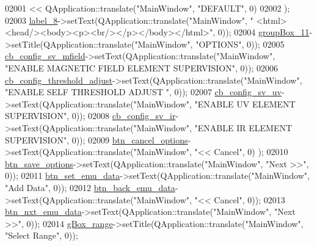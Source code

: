 \begin{DoxyCode}
02001          << QApplication::translate(\textcolor{stringliteral}{"MainWindow"}, \textcolor{stringliteral}{"DEFAULT"}, 0)
02002         );
02003         \hyperlink{a00080_af183bfbfb9f38bbdd60caf92b15e23dc}{label\_8}->setText(QApplication::translate(\textcolor{stringliteral}{"MainWindow"}, \textcolor{stringliteral}{"
      <html><head/><body><p><br/></p></body></html>"}, 0));
02004         \hyperlink{a00080_a417cb0342ea95d3fe5f7e3f4feeb6515}{groupBox\_11}->setTitle(QApplication::translate(\textcolor{stringliteral}{"MainWindow"}, \textcolor{stringliteral}{"OPTIONS"}, 0));
02005         \hyperlink{a00080_a0a83284035ab2dbaeb39946522434986}{cb\_config\_sv\_mfield}->setText(QApplication::translate(\textcolor{stringliteral}{"MainWindow"}, \textcolor{stringliteral}{"ENABLE
       MAGNETIC FIELD ELEMENT SUPERVISION"}, 0));
02006         \hyperlink{a00080_a433ffc427e1103e6c2939f949ee5e5b5}{cb\_config\_threshold\_adjust}->setText(QApplication::translate(\textcolor{stringliteral}{"MainWindow"},
       \textcolor{stringliteral}{"ENABLE SELF THRESHOLD ADJUST "}, 0));
02007         \hyperlink{a00080_a3a93cd0a3f3738aad252d063a8677839}{cb\_config\_sv\_uv}->setText(QApplication::translate(\textcolor{stringliteral}{"MainWindow"}, \textcolor{stringliteral}{"ENABLE UV ELEMENT
       SUPERVISION"}, 0));
02008         \hyperlink{a00080_a4db3ccfbbf8c5222dd2f042d3073bbe8}{cb\_config\_sv\_ir}->setText(QApplication::translate(\textcolor{stringliteral}{"MainWindow"}, \textcolor{stringliteral}{"ENABLE IR ELEMENT
       SUPERVISION"}, 0));
02009         \hyperlink{a00080_a39d7e34aed8750622569f0819dd7c8c2}{btn\_cancel\_options}->setText(QApplication::translate(\textcolor{stringliteral}{"MainWindow"}, \textcolor{stringliteral}{"<< Cancel"}, 0)
      );
02010         \hyperlink{a00080_a409e5b794dbab22d7b958be406b6a030}{btn\_save\_options}->setText(QApplication::translate(\textcolor{stringliteral}{"MainWindow"}, \textcolor{stringliteral}{"Next >>"}, 0));
02011         \hyperlink{a00080_ad05944ce9c8afb0ab60549a326b8e0af}{btn\_set\_emu\_data}->setText(QApplication::translate(\textcolor{stringliteral}{"MainWindow"}, \textcolor{stringliteral}{"Add Data"}, 0));
02012         \hyperlink{a00080_ab6199bde688a9b2e91e192278190dda7}{btn\_back\_emu\_data}->setText(QApplication::translate(\textcolor{stringliteral}{"MainWindow"}, \textcolor{stringliteral}{"<< Cancel"}, 0));
02013         \hyperlink{a00080_a11126ea7922009f1354c9bfefb93f5e9}{btn\_nxt\_emu\_data}->setText(QApplication::translate(\textcolor{stringliteral}{"MainWindow"}, \textcolor{stringliteral}{"Next >>"}, 0));
02014         \hyperlink{a00080_a3c12d0504a310784c3820d1a9ad469c2}{gBox\_range}->setTitle(QApplication::translate(\textcolor{stringliteral}{"MainWindow"}, \textcolor{stringliteral}{"Select Range"}, 0));

\end{DoxyCode}
